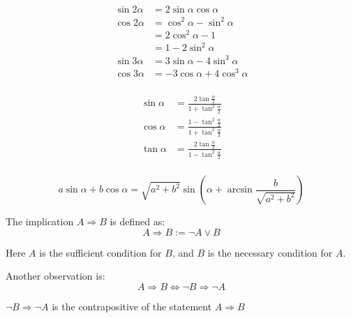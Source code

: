 \begin{theorem}
\begin{equation}
    \begin{aligned}    
        \sin 2\alpha &= 2 \sin\alpha \cos\alpha \\
        \cos 2\alpha &= \cos^2 \alpha - \sin^2 \alpha \\
        &= 2 \cos^2 \alpha - 1 \\
        &= 1 - 2 \sin^2 \alpha \\
        \sin 3\alpha &= 3 \sin\alpha - 4 \sin^3 \alpha \\
        \cos 3\alpha &= -3 \cos\alpha + 4 \cos^3 \alpha \\
    \end{aligned}
\end{equation}

\begin{equation}
    \begin{aligned}       
        \sin \alpha &= \frac{2 \tan \frac{\alpha}{2}}{1 + \tan^2 \frac{\alpha}{2}} \\
        \cos \alpha &= \frac{1 - \tan^2 \frac{\alpha}{2}}{1 + \tan^2 \frac{\alpha}{2}} \\
        \tan \alpha &= \frac{2 \tan \frac{\alpha}{2}}{1 - \tan^2 \frac{\alpha}{2}} \\  
    \end{aligned}
\end{equation}


\begin{equation}
    a \sin\alpha + b \cos\alpha = \sqrt{a^2 + b^2}\sin\left(\alpha + \arcsin\frac{b}{\sqrt{a^2 + b^2}}\right)
\end{equation}

\end{theorem}



\begin{definition}    
The implication $A \Rightarrow B$ is defined as:
\begin{equation}
    A \Rightarrow B := \neg A \vee B
\end{equation}

Here $A$ is the sufficient condition for $B$, and $B$ is the necessary condition for $A$.

Another observation is:
\begin{equation}
    A \Rightarrow B \Leftrightarrow \neg B \Rightarrow \neg A
\end{equation}

$\neg B \Rightarrow \neg A$ is the contrapositive of the statement $A \Rightarrow B$
\end{definition}

